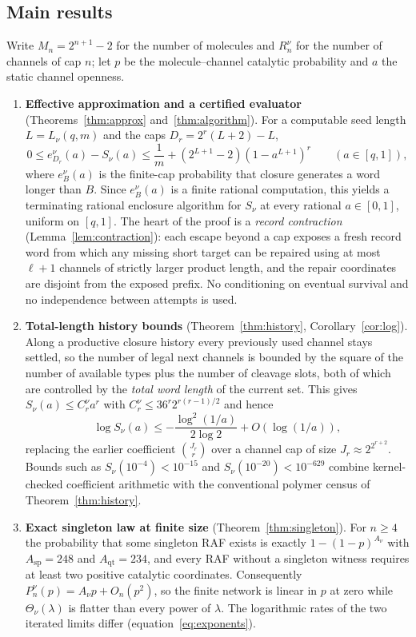 \documentclass[11pt,a4paper]{article}
\theoremstyle{plain}
\theoremstyle{definition}
\theoremstyle{remark}
\newcommand{\qt}{\mathrm{qt}}
\newcommand{\spc}{\mathrm{sp}}
\begin{document}
\subsection*{Main results}
Write $M_n=2^{n+1}-2$ for the number of molecules and $R_n^\nu$ for the number of channels of cap $n$; let $p$ be the molecule--channel catalytic probability and $a$ the static channel openness.

\begin{enumerate}[label=\textbf{(\Alph*)},leftmargin=2.6em]
\item \textbf{Effective approximation and a certified evaluator} (Theorems~\ref{thm:approx} and~\ref{thm:algorithm}). For a computable seed length $L=L_\nu(q,m)$ and the caps $D_r=2^r(L+2)-L$,
\[
0\le e^\nu_{D_r}(a)-S_\nu(a)\le\frac1m+(2^{L+1}-2)(1-a^{L+1})^r\qquad(a\in[q,1]),
\]
where $e^\nu_B(a)$ is the finite-cap probability that closure generates a word longer than $B$. Since $e^\nu_B(a)$ is a finite rational computation, this yields a terminating rational enclosure algorithm for $S_\nu$ at every rational $a\in[0,1]$, uniform on $[q,1]$. The heart of the proof is a \emph{record contraction} (Lemma~\ref{lem:contraction}): each escape beyond a cap exposes a fresh record word from which any missing short target can be repaired using at most $\ell+1$ channels of strictly larger product length, and the repair coordinates are disjoint from the exposed prefix. No conditioning on eventual survival and no independence between attempts is used.
\item \textbf{Total-length history bounds} (Theorem~\ref{thm:history}, Corollary~\ref{cor:log}). Along a productive closure history every previously used channel stays settled, so the number of legal next channels is bounded by the square of the number of available types plus the number of cleavage slots, both of which are controlled by the \emph{total word length} of the current set. This gives $S_\nu(a)\le C_r^\nu a^r$ with $C_r^\nu\le36^r2^{r(r-1)/2}$ and hence
\[
\log S_\nu(a)\le-\frac{\log^2(1/a)}{2\log2}+O(\log(1/a)),
\]
replacing the earlier coefficient $\binom{J_r}{r}$ over a channel cap of size $J_r\approx 2^{2^{r+2}}$. Bounds such as $S_\nu(10^{-4})<10^{-15}$ and $S_\nu(10^{-20})<10^{-629}$ combine kernel-checked coefficient arithmetic with the conventional polymer census of Theorem~\ref{thm:history}.
\item \textbf{Exact singleton law at finite size} (Theorem~\ref{thm:singleton}). For $n\ge4$ the probability that some singleton RAF exists is exactly $1-(1-p)^{A_\nu}$ with $A_{\spc}=248$ and $A_{\qt}=234$, and every RAF without a singleton witness requires at least two positive catalytic coordinates. Consequently $P^\nu_n(p)=A_\nu p+O_n(p^2)$, so the finite network is linear in $p$ at zero while $\Theta_\nu(\lambda)$ is flatter than every power of $\lambda$. The logarithmic rates of the two iterated limits differ (equation~\eqref{eq:exponents}).

\end{enumerate}
\end{document}
